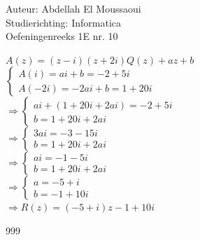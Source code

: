 \documentclass[a4paper]{article}
\begin{document}
  
\noindent \large Auteur: Abdellah El Moussaoui \\
\noindent \large Studierichting: Informatica\\
\noindent \large Oefeningenreeks 1E nr. 10\\

\medskip

\normalsize

\medskip

$A(z)=(z-i)(z+2i)Q(z)+az+b$\\

$\left\{
\begin{array}{l}
A(i)=ai+b=-2+5i\\
A(-2i)=-2ai+b=1+20i
\end{array}
\right.$\\

$\Rightarrow
\left\{
\begin{array}{l}
ai+\left(1+20i+2ai\right)=-2+5i\\
b=1+20i+2ai
\end{array}
\right.$\\

$\Rightarrow
\left\{
\begin{array}{l}
3ai=-3-15i\\
b=1+20i+2ai
\end{array}
\right.$\\

$\Rightarrow
\left\{
\begin{array}{l}
ai=-1-5i\\
b=1+20i+2ai
\end{array}
\right.$\\

$\Rightarrow
\left\{
\begin{array}{l}
a=-5+i\\
b=-1+10i
\end{array}
\right.$\\

$\Rightarrow R(z)=(-5+i)z-1+10i$

\begin{thebibliography}{999}
\end{thebibliography}
\end{document}
